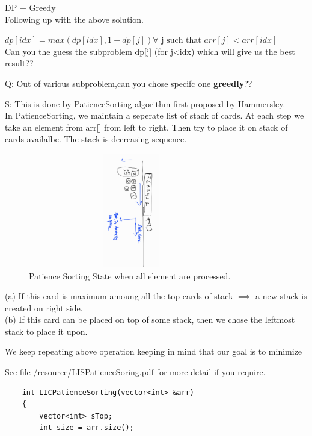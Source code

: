 \begin{solution}
    DP + Greedy\\
    Following up with the above solution.
    
    $dp[idx] = max(dp[idx] , 1+dp[j]) \forall \text{ j such that } arr[j] < arr[idx]$\\
    Can you the guess the subproblem dp[j] (for j<idx) which will give us the best result??

    \medskip
    Q: Out of various subproblem,can you chose specifc one \textbf{greedly}?? \newline

    \smallskip
    S: This is done by PatienceSorting algorithm first proposed by Hammersley.\\ In PatienceSorting, we maintain a seperate list of stack of cards.
        At each step we take an element from arr[] from left to right. Then try to place it on stack of cards availalbe.
        The stack is decreasing sequence.\\
        
        \begin{figure}[ht]
        \includegraphics[angle=90,width=9cm,height=5cm]{./resources/PatienceSoring.jpg}
        \caption{Patience Sorting State when all element are processed.}
        \end{figure}
        
        (a) If this card is maximum amoung all the top cards of stack $\implies$ a new stack is created on right side.\\
        (b) If this card can be placed on top of some stack, then we chose the leftmost stack to place it upon.
        
        We keep repeating above operation keeping in mind that our goal is to minimize 

        See file /resource/LISPatienceSoring.pdf for more detail if you require.

    \begin{verbatim}
    int LICPatienceSorting(vector<int> &arr)
    {
        vector<int> sTop; 
        int size = arr.size();
        

\end{verbatim}
\end{solution}
